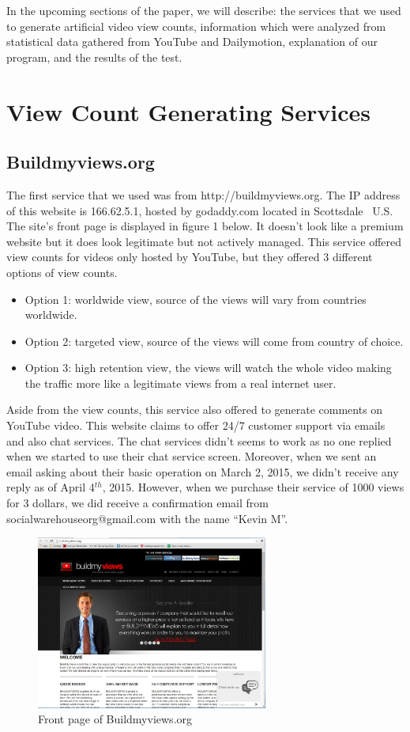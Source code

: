 \documentclass[conference]{IEEEtran}
\begin{document}
In the upcoming sections of the paper, we will describe: the services that we used to generate artificial video view counts, information which were analyzed from statistical data gathered from YouTube and Dailymotion, explanation of our program, and the results of the test.

\section{View Count Generating Services}

\subsection{Buildmyviews.org}
The first service that we used was from http://buildmyviews.org. The IP address of this website is 166.62.5.1, hosted by godaddy.com located in Scottsdale~\cite{c6} U.S. The site’s front page is displayed in figure 1 below. It doesn't look like a premium website but it does look legitimate but not actively managed. This service offered view counts for videos only hosted by YouTube, but they offered 3 different options of view counts.

\begin{itemize}
  \item Option 1: worldwide view, source of the views will vary from countries worldwide.
  \item Option 2: targeted view, source of the views will come from country of choice.
  \item Option 3: high retention view, the views will watch the whole video making the traffic more like a legitimate views from a real internet user.
\end{itemize}

Aside from the view counts, this service also offered to generate comments on YouTube video. This website claims to offer 24/7 customer support via emails and also chat services. The chat services didn't seems to work as no one replied when we started to use their chat service screen. Moreover, when we sent an email asking about their basic operation on March 2, 2015, we didn't receive any reply as of April 4$^{th}$, 2015. However, when we purchase their service of 1000 views for 3 dollars, we did receive a confirmation email from socialwarehouseorg@gmail.com with the name ``Kevin M''.

\begin{figure}
  \centering
  \includegraphics[width=3.0in]{fig1}
  \caption{Front page of Buildmyviews.org}
\end{figure}
\end{document}

